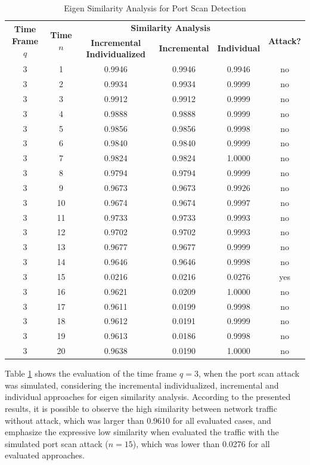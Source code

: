 \begin{table}[h!]
  \centering
  \footnotesize
  \caption{Eigen Similarity Analysis for Port Scan Detection}
  \label{tab:tab5}
  \begin{tabular}{ c c c c c c }
	\toprule
	\multirow{2}{*}{\textbf{Time Frame} $q$} &\multirow{2}{*}{\textbf{Time} $n$}   &\multicolumn{3}{c}{\textbf{Similarity Analysis}} &\multirow{2}{*}{\textbf{Attack?}}\\ 
			\hhline{~~---~}
			& &\textbf{Incremental Individualized} &\textbf{Incremental} &\textbf{Individual}\\
	\midrule
	3 &1 &0.9946 &0.9946 &0.9946 &no \\
	3 &2 &0.9934 &0.9934 &0.9999 &no \\
	3 &3 &0.9912 &0.9912 &0.9999 &no \\
	3 &4 &0.9888 &0.9888 &0.9999 &no \\
	3 &5 &0.9856 &0.9856 &0.9998 &no \\
	3 &6 &0.9840 &0.9840 &0.9999 &no \\
	3 &7 &0.9824 &0.9824 &1.0000 &no \\
	3 &8 &0.9794 &0.9794 &0.9999 &no \\
	3 &9 &0.9673 &0.9673 &0.9926 &no \\
	3 &10 &0.9674 &0.9674 &0.9997 &no \\
	3 &11 &0.9733 &0.9733 &0.9993 &no \\
	3 &12 &0.9702 &0.9702 &0.9993 &no \\
	3 &13 &0.9677 &0.9677 &0.9999 &no \\
	3 &14 &0.9646 &0.9646 &0.9998 &no \\
	3 &15 &0.0216 &0.0216 &0.0276 &yes \\
	3 &16 &0.9621 &0.0209 &1.0000 &no \\
	3 &17 &0.9611 &0.0199 &0.9998 &no \\
	3 &18 &0.9612 &0.0191 &0.9999 &no \\
	3 &19 &0.9613 &0.0186 &0.9998 &no \\
	3 &20 &0.9638 &0.0190 &1.0000 &no \\
    \bottomrule
  \end{tabular}
\end{table}

Table \ref{tab:tab5} shows the evaluation of the time frame $q=3$, when the port scan attack was simulated, considering the incremental individualized, incremental and individual approaches for eigen similarity analysis. According to the presented results, it is possible to observe the high similarity between network traffic without attack, which was larger than 0.9610 for all evaluated cases, and emphasize the expressive low similarity when evaluated the traffic with the simulated port scan attack ($n=15$), which was lower than 0.0276 for all evaluated approaches.


